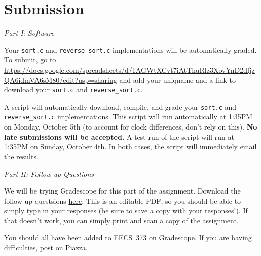 \documentclass{article}
\begin{document}
\section*{Submission}

\emph{Part I: Software}

\medskip
\noindent
Your \texttt{sort.c} and \texttt{reverse\_sort.c} implementations will be
automatically graded. To submit, go to
\url{https://docs.google.com/spreadsheets/d/1AGWtXCvt7iAtThuRlz3XovYnD2dfjzQA6idmVA6sM80/edit?usp=sharing}
and add your uniqname and a link to download your \texttt{sort.c} and
\texttt{reverse\_sort.c}.

\medskip
\noindent
A script will automatically download, compile, and grade your \texttt{sort.c}
and \texttt{reverse\_sort.c} implementations. This script will run
automatically at 1:35PM on Monday, October 5th (to account for clock
differences, don't rely on this).
\textbf{\color{red}No late submissions will be accepted.}
A test run of the script will run at 1:35PM on Sunday, October 4th. In both
cases, the script will immediately email the results.


\bigskip
\noindent
\emph{Part II: Follow-up Questions}

\medskip
\noindent
We will be trying Gradescope for this part of the assignment. Download the follow-up questsions
\href{http://web.eecs.umich.edu/~prabal/teaching/eecs373/homeworks/373-F15-HW4-followup.pdf}{here}.
This is an editable PDF, so you should be able to simply type in your
responses (be sure to save a copy with your responses!). If that doesn't work,
you can simply print and scan a copy of the assignment.

\smallskip
\noindent
You should all have been added to EECS~373 on Gradescope. If you are having
difficulties, post on Piazza.
\end{document}
